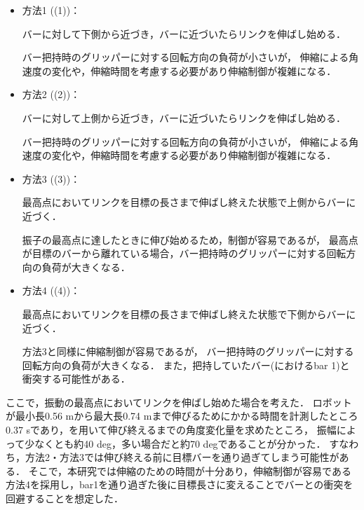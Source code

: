         \begin{itemize}
        \item 方法1 ((1))：
        
        バーに対して下側から近づき，バーに近づいたらリンクを伸ばし始める．

        バー把持時のグリッパーに対する回転方向の負荷が小さいが，
        伸縮による角速度の変化や，伸縮時間を考慮する必要があり伸縮制御が複雑になる．
        
        \item 方法2 ((2))：
        
        バーに対して上側から近づき，バーに近づいたらリンクを伸ばし始める．
        
        バー把持時のグリッパーに対する回転方向の負荷が小さいが，
        伸縮による角速度の変化や，伸縮時間を考慮する必要があり伸縮制御が複雑になる．

        \item 方法3 ((3))：
        
        最高点においてリンクを目標の長さまで伸ばし終えた状態で上側からバーに近づく．
        
        振子の最高点に達したときに伸び始めるため，制御が容易であるが，
        最高点が目標のバーから離れている場合，バー把持時のグリッパーに対する回転方向の負荷が大きくなる．
        
        \item 方法4 ((4))：
        
        最高点においてリンクを目標の長さまで伸ばし終えた状態で下側からバーに近づく．

        方法3と同様に伸縮制御が容易であるが，
        バー把持時のグリッパーに対する回転方向の負荷が大きくなる．
        また，把持していたバー(におけるbar 1)と衝突する可能性がある．

        \end{itemize}

        ここで，振動の最高点においてリンクを伸ばし始めた場合を考えた．
        ロボットが最小長0.56 mから最大長0.74 mまで伸びるためにかかる時間を計測したところ
        0.37 sであり，を用いて伸び終えるまでの角度変化量を求めたところ，
        振幅によって少なくとも約40 deg，多い場合だと約70 degであることが分かった．
        すなわち，方法2・方法3では伸び終える前に目標バーを通り過ぎてしまう可能性がある．
        そこで，本研究では伸縮のための時間が十分あり，伸縮制御が容易である方法4を採用し，bar1を通り過ぎた後に目標長さに変えることでバーとの衝突を回避することを想定した．

